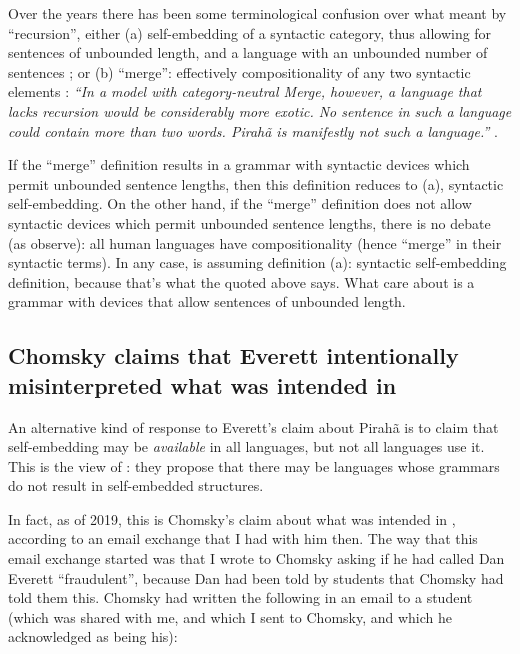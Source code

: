 \documentclass{article}
\begin{document}
Over the years there has been some terminological confusion over what \citet{hauser2002faculty} meant by ``recursion'', either (a) self-embedding of a syntactic category, thus allowing for sentences of unbounded length, and a language with an unbounded number of sentences \citep{everett2005cultural}; or (b) ``merge'': effectively compositionality of any two syntactic elements \citep{nevins2009evidence}: \textit{``In a model with category-neutral Merge, however, a language that lacks recursion would be considerably more exotic. No sentence in such a language could contain more than two words. Pirahã is manifestly not such a language.''} \citep[366]{nevins2009evidence}.

If the ``merge'' definition results in a grammar with syntactic devices which permit unbounded sentence lengths, then this definition reduces to (a), syntactic self-embedding. On the other hand, if the ``merge'' definition does not allow syntactic devices which permit unbounded sentence lengths, there is no debate (as \citet{nevins2009evidence} observe): all human languages have compositionality (hence ``merge'' in their syntactic terms). In any case, \citet{everett2005cultural} is assuming definition (a): syntactic self-embedding definition, because that’s what the \citet{hauser2002faculty} quoted above says. What \citet{hauser2002faculty} care about is a grammar with devices that allow sentences of unbounded length.

\subsection{Chomsky claims that Everett intentionally misinterpreted what was intended in \citet{hauser2002faculty}}

An alternative kind of response to Everett’s claim about Pirahã is to claim that self-embedding may be \textit{available} in all languages, but not all languages use it. This is the view of \citet{jackendoff2014what}: they propose that there may be languages whose grammars do not result in self-embedded structures.

In fact, as of 2019, this is Chomsky’s claim about what was intended in \citet{hauser2002faculty}, according to an email exchange that I had with him then. The way that this email exchange started was that I wrote to Chomsky asking if he had called Dan Everett ``fraudulent'', because Dan had been told by students that Chomsky had told them this. Chomsky had written the following in an email to a student (which was shared with me, and which I sent to Chomsky, and which he acknowledged as being his):
\end{document}
